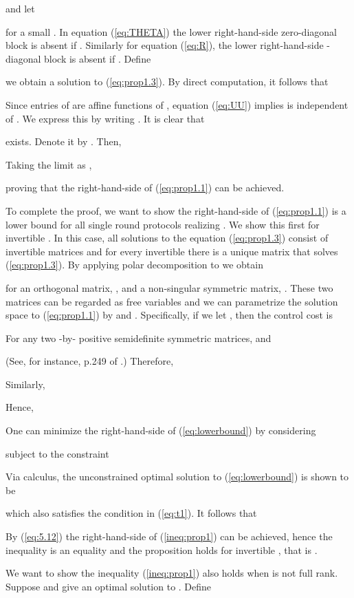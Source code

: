 \documentclass[12pt,onecolumn,draftcls]{IEEEtran}
\begin{document}
and let

for a small .  In equation (\ref{eq:THETA}) the lower right-hand-side zero-diagonal block is absent if .
Similarly for equation (\ref{eq:R}), the lower right-hand-side -diagonal block is absent if .   Define

we obtain a solution to (\ref{eq:prop1.3}).  
By direct computation, it follows that

Since entries of  are affine functions of , equation (\ref{eq:UU})
implies 
is independent of .   We express this by writing .  It is clear that

exists.  Denote it by .
Then,

Taking the limit as ,

proving that the right-hand-side of (\ref{eq:prop1.1}) can be achieved.

To complete the proof, we want to show  the right-hand-side of (\ref{eq:prop1.1}) is a lower bound for all
single round protocols realizing .   We show this first for invertible .  In this case, all solutions
 to the equation (\ref{eq:prop1.3})
consist of invertible matrices and for every invertible  there is a unique matrix  that solves (\ref{eq:prop1.3}).
By applying polar decomposition to  we obtain
 
for an orthogonal matrix, , and a non-singular symmetric matrix, .
These two matrices can be regarded as free variables and we can parametrize the solution space
to (\ref{eq:prop1.1}) by  and .
Specifically, if we let , then the control cost is


For any two -by- positive semidefinite symmetric matrices, 
 and 

(See, for instance, p.249 of \cite{mo}.)  Therefore,

Similarly,

Hence,

One can minimize the right-hand-side of (\ref{eq:lowerbound}) by considering

subject to the constraint

Via calculus, the unconstrained optimal solution to (\ref{eq:lowerbound}) is shown to be

which also satisfies the condition in (\ref{eq:t1}).  It follows that

By (\ref{eq:5.12}) the right-hand-side of (\ref{ineq:prop1}) can be achieved, hence the inequality is an equality and the proposition holds for invertible , that is .

We want to show the inequality (\ref{ineq:prop1}) also holds when  is not full rank.
Suppose  and  give an optimal solution to .
Define
\end{document}
